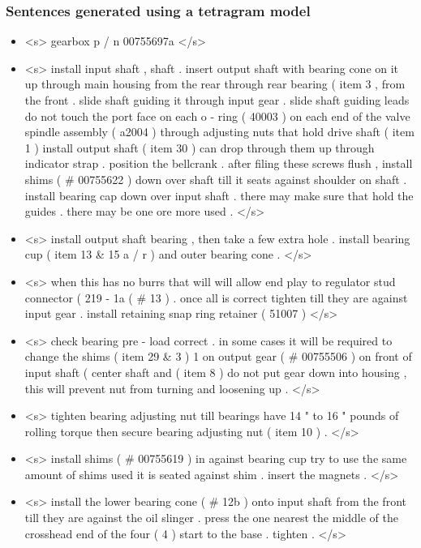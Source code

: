 \subsubsection{Sentences generated using a tetragram model}\label{subsec:tetragram-sentences}

\begin{itemize}
	\item <s> gearbox p / n 00755697a </s>
	\item <s> install input shaft , shaft . insert output shaft with bearing cone on it up through main housing from the rear through rear bearing ( item 3 , from the front . slide shaft guiding it through input gear . slide shaft guiding leads do not touch the port face on each o - ring ( 40003 ) on each end of the valve spindle assembly ( a2004 ) through adjusting nuts that hold drive shaft ( item 1 ) install output shaft ( item 30 ) can drop through them up through indicator strap . position the bellcrank . after filing these screws flush , install shims ( \# 00755622 ) down over shaft till it seats against shoulder on shaft . install bearing cap down over input shaft . there may make sure that hold the guides . there may be one ore more used . </s>
	\item <s> install output shaft bearing , then take a few extra hole . install bearing cup ( item 13 \& 15 a / r ) and outer bearing cone . </s>
	\item <s> when this has no burrs that will will allow end play to regulator stud connector ( 219 - 1a ( \# 13 ) . once all is correct tighten till they are against input gear . install retaining snap ring retainer ( 51007 ) </s>
	\item <s> check bearing pre - load correct . in some cases it will be required to change the shims ( item 29 \& 3 ) 1 on output gear ( \# 00755506 ) on front of input shaft ( center shaft and ( item 8 ) do not put gear down into housing , this will prevent nut from turning and loosening up . </s>
	\item <s> tighten bearing adjusting nut till bearings have 14 " to 16 " pounds of rolling torque then secure bearing adjusting nut ( item 10 ) . </s>
	\item <s> install shims ( \# 00755619 ) in against bearing cup try to use the same amount of shims used it is seated against shim . insert the magnets . </s>
	\item <s> install the lower bearing cone ( \# 12b ) onto input shaft from the front till they are against the oil slinger . press the one nearest the middle of the crosshead end of the four ( 4 ) start to the base . tighten . </s>

\end{itemize}
